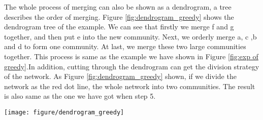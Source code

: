 \documentclass[12pt,oneside,final]{vlsithesis}
\begin{document}
The whole process of merging can also be shown as a dendrogram, a tree describes the order of merging. Figure \ref{fig:dendrogram_greedy} shows the dendrogram tree of the example. We can see that firstly we merge f and g together, and then put e into the new community. Next, we orderly merge a, c ,b and d to form one community. At last, we merge these two large communities together. This process is same as the example we have shown in Figure \ref{fig:exp of greedy}.In addition, cutting through the dendrogram can get the division strategy of the network. As Figure \ref{fig:dendrogram_greedy} shown, if we divide the network as the red dot line, the whole network into two communities. The result is also same as the one we have got when step 5. 
 
\begin{figure*}
	\centering
	\texttt{[image: figure/dendrogram\_greedy]}
	\caption{Dendrogram result of greedy algorithm}
	\label{fig:dendrogram_greedy}
\end{figure*}
\end{document}
